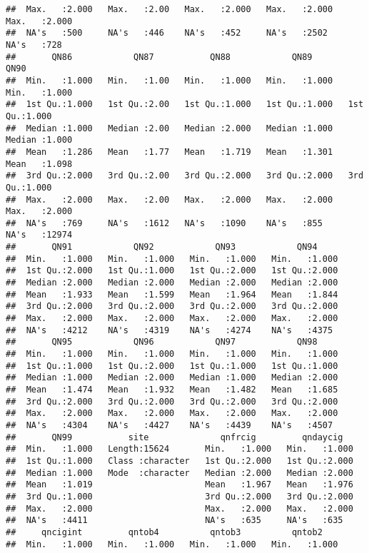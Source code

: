 \documentclass[
]{article}
\begin{document}
\begin{verbatim}
##  Max.   :2.000   Max.   :2.00   Max.   :2.000   Max.   :2.000   Max.   :2.000  
##  NA's   :500     NA's   :446    NA's   :452     NA's   :2502    NA's   :728    
##       QN86            QN87           QN88            QN89            QN90      
##  Min.   :1.000   Min.   :1.00   Min.   :1.000   Min.   :1.000   Min.   :1.000  
##  1st Qu.:1.000   1st Qu.:2.00   1st Qu.:1.000   1st Qu.:1.000   1st Qu.:1.000  
##  Median :1.000   Median :2.00   Median :2.000   Median :1.000   Median :1.000  
##  Mean   :1.286   Mean   :1.77   Mean   :1.719   Mean   :1.301   Mean   :1.098  
##  3rd Qu.:2.000   3rd Qu.:2.00   3rd Qu.:2.000   3rd Qu.:2.000   3rd Qu.:1.000  
##  Max.   :2.000   Max.   :2.00   Max.   :2.000   Max.   :2.000   Max.   :2.000  
##  NA's   :769     NA's   :1612   NA's   :1090    NA's   :855     NA's   :12974  
##       QN91            QN92            QN93            QN94      
##  Min.   :1.000   Min.   :1.000   Min.   :1.000   Min.   :1.000  
##  1st Qu.:2.000   1st Qu.:1.000   1st Qu.:2.000   1st Qu.:2.000  
##  Median :2.000   Median :2.000   Median :2.000   Median :2.000  
##  Mean   :1.933   Mean   :1.599   Mean   :1.964   Mean   :1.844  
##  3rd Qu.:2.000   3rd Qu.:2.000   3rd Qu.:2.000   3rd Qu.:2.000  
##  Max.   :2.000   Max.   :2.000   Max.   :2.000   Max.   :2.000  
##  NA's   :4212    NA's   :4319    NA's   :4274    NA's   :4375   
##       QN95            QN96            QN97            QN98      
##  Min.   :1.000   Min.   :1.000   Min.   :1.000   Min.   :1.000  
##  1st Qu.:1.000   1st Qu.:2.000   1st Qu.:1.000   1st Qu.:1.000  
##  Median :1.000   Median :2.000   Median :1.000   Median :2.000  
##  Mean   :1.474   Mean   :1.932   Mean   :1.482   Mean   :1.685  
##  3rd Qu.:2.000   3rd Qu.:2.000   3rd Qu.:2.000   3rd Qu.:2.000  
##  Max.   :2.000   Max.   :2.000   Max.   :2.000   Max.   :2.000  
##  NA's   :4304    NA's   :4427    NA's   :4439    NA's   :4507   
##       QN99           site              qnfrcig         qndaycig    
##  Min.   :1.000   Length:15624       Min.   :1.000   Min.   :1.000  
##  1st Qu.:1.000   Class :character   1st Qu.:2.000   1st Qu.:2.000  
##  Median :1.000   Mode  :character   Median :2.000   Median :2.000  
##  Mean   :1.019                      Mean   :1.967   Mean   :1.976  
##  3rd Qu.:1.000                      3rd Qu.:2.000   3rd Qu.:2.000  
##  Max.   :2.000                      Max.   :2.000   Max.   :2.000  
##  NA's   :4411                       NA's   :635     NA's   :635    
##     qncigint         qntob4          qntob3          qntob2     
##  Min.   :1.000   Min.   :1.000   Min.   :1.000   Min.   :1.000  

\end{verbatim}
\end{document}
